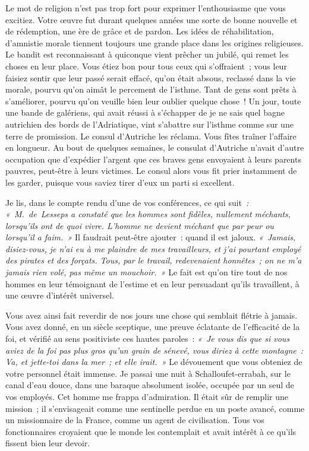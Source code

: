 \documentclass[french,twoside]{book} %
\newcommand\orgName[1]{#1}
\newcommand\persName[1]{#1}
\newcommand\placeName[1]{#1}
\begin{document}
Le mot de religion n’est pas trop fort pour exprimer l’enthousiasme que vous excitiez. Votre œuvre fut durant quelques années une sorte de bonne nouvelle et de rédemption, une ère de grâce et de pardon. Les idées de réhabilitation, d’amnistie morale tiennent toujours une grande place dans les origines religieuses. Le bandit est reconnaissant à quiconque vient prêcher un jubilé, qui remet les choses en leur place. Vous étiez bon pour tous ceux qui s’offraient ; vous leur faisiez sentir que leur passé serait effacé, qu’on était absous, reclassé dans la vie morale, pourvu qu’on aimât le percement de l’isthme. Tant de gens sont prêts à s’améliorer, pourvu qu’on veuille bien leur oublier quelque chose ! Un jour, toute une bande de galériens, qui avait réussi à s’échapper de je ne sais quel bagne autrichien des bords de l’{\placeName Adriatique}, vint s’abattre sur l’isthme comme sur une terre de promission. Le {\persName consul d’Autriche} les réclama. Vous fîtes traîner l’affaire en longueur. Au bout de quelques semaines, le {\orgName consulat d’Autriche }n’avait d’autre occupation que d’expédier l’argent que ces braves gens envoyaient à leurs parents pauvres, peut-être à leurs victimes. Le consul alors vous fit prier instamment de les garder, puisque vous saviez tirer d’eux un parti si excellent.\par
Je lis, dans le compte rendu d’une de vos conférences, ce qui suit \emph{: « {\persName M. de Lesseps} a constaté que les hommes sont fidèles, nullement méchants, lorsqu’ils ont de quoi vivre. L’homme ne devient méchant que par peur ou lorsqu’il a faim. »} Il faudrait peut-être ajouter : quand il est jaloux. \emph{« Jamais, disiez-vous, je n’ai eu à me plaindre de mes travailleurs, et j’ai pourtant employé des pirates et des forçats. Tous, par le travail, redevenaient honnêtes ; on ne m’a jamais rien volé, pas même un mouchoir. »} Le fait est qu’on tire tout de nos hommes en leur témoignant de l’estime et en leur persuadant qu’ils travaillent, à une œuvre d’intérêt universel.\par
Vous avez ainsi fait reverdir de nos jours une chose qui semblait flétrie à jamais. Vous avez donné, en un siècle sceptique, une preuve éclatante de l’efficacité de la foi, et vérifié au sens positiviste ces hautes paroles : \emph{« Je vous dis que si vous aviez de la foi pas plus gros qu’un grain de sénevé, vous diriez à cette montagne : Va, et jette-toi dans la mer ; et elle irait. »} Le dévouement que vous obteniez de votre personnel était immense. Je passai une nuit à {\placeName Schalloufet-errabah}, sur le canal d’eau douce, dans une baraque absolument isolée, occupée par un seul de vos employés. Cet homme me frappa d’admiration. Il était sûr de remplir une mission ; il s’envisageait comme une sentinelle perdue en un poste avancé, comme un missionnaire de la {\placeName France}, comme un agent de civilisation. Tous vos fonctionnaires croyaient que le monde les contemplait et avait intérêt à ce qu’ils fissent bien leur devoir.\par
\end{document}
